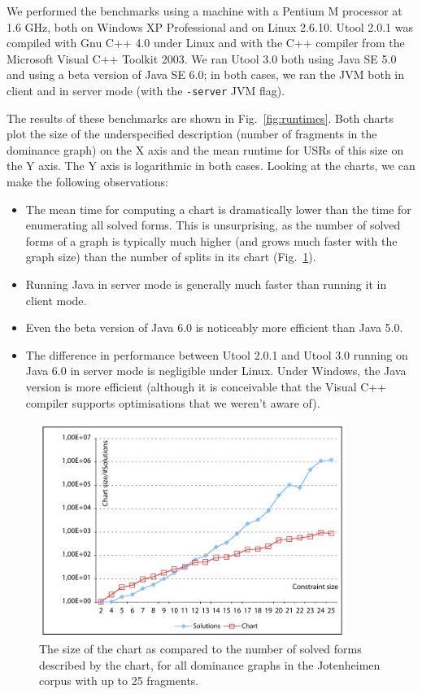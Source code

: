We performed the benchmarks using a machine with a Pentium M processor
at 1.6 GHz, both on Windows XP Professional and on Linux 2.6.10. Utool
2.0.1 was compiled with Gnu C++ 4.0 under Linux and with the C++
compiler from the Microsoft Visual C++ Toolkit 2003. We ran Utool 3.0
both using Java SE 5.0 and using a beta version of Java SE 6.0; in
both cases, we ran the JVM both in client and in server mode (with the
\verb?-server? JVM flag).

The results of these benchmarks are shown in
Fig.~\ref{fig:runtimes}. Both charts plot the size of the
underspecified description (number of fragments in the dominance
graph) on the X axis and the mean runtime for USRs of this size on the
Y axis. The Y axis is logarithmic in both cases. Looking at the
charts, we can make the following observations:
\begin{itemize}
\item The mean time for computing a chart is dramatically lower than
the time for enumerating all solved forms. This is unsurprising, as
the number of solved forms of a graph is typically much higher (and
grows much faster with the graph size) than the number of splits in
its chart (Fig.~\ref{fig:chart-vs-solutions}).
\item Running Java in server mode is generally much faster than
running it in client mode.
\item Even the beta version of Java 6.0 is noticeably more efficient
than Java 5.0.
\item The difference in performance between Utool 2.0.1 and Utool 3.0
running on Java 6.0 in server mode is negligible under Linux. Under
Windows, the Java version is more efficient (although it is
conceivable that the Visual C++ compiler supports optimisations that
we weren't aware of).
\end{itemize}



\begin{figure}
\centering
\includegraphics[width=10cm]{chart-vs-solutions.pdf}
\caption{The size of the chart as compared to the number of solved
forms described by the chart, for all dominance graphs in the
Jotenheimen corpus with up to 25 fragments. \label{fig:chart-vs-solutions}}

\end{figure}






